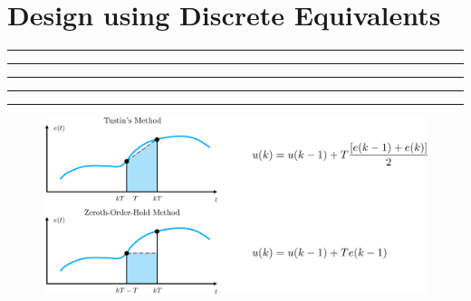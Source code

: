 \setcounter{chapter}{7}
\setcounter{section}{2}
\section{Design using Discrete Equivalents}
\vspace{-8pt} \hrule \hrule \hrule \hrule \hrule  \vspace{12pt}

		\begin{figure}[h]
			\centering
			\includegraphics[width=20cm]{./FIG_Franklin/fig8-smc7.png}
		\end{figure}